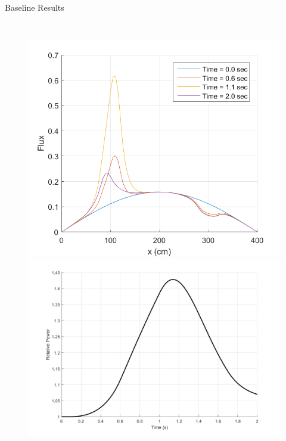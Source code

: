 \documentclass[8pt,xcolor=dvipnames]{beamer}
\begin{document}
\begin{frame}{Baseline Results}

\begin{columns}
\column{\dimexpr\paperwidth-10pt}
\begin{figure}
\includegraphics[width=0.45\linewidth]{figures/1D_flux.png}
\includegraphics[width=0.55\linewidth]{figures/1D_power_base.png}
\end{figure}
\end{columns}

\end{frame}
\end{document}
